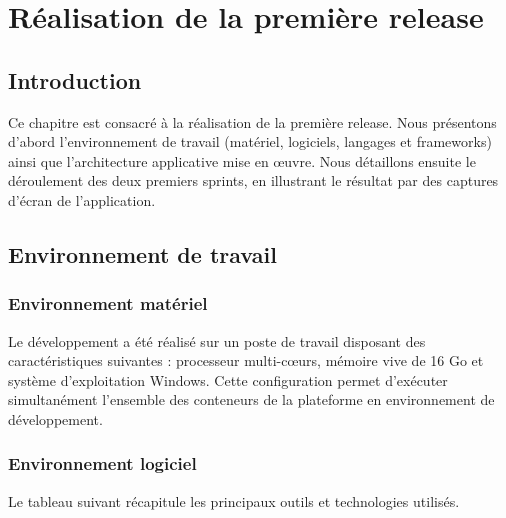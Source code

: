 \chapter{Réalisation de la première release}
\minitoc
\vspace{0.6cm}

\section*{Introduction}
Ce chapitre est consacré à la réalisation de la première release. Nous présentons d'abord
l'environnement de travail (matériel, logiciels, langages et frameworks) ainsi que
l'architecture applicative mise en œuvre. Nous détaillons ensuite le déroulement des deux
premiers sprints, en illustrant le résultat par des captures d'écran de l'application.

\section{Environnement de travail}

\subsection{Environnement matériel}
Le développement a été réalisé sur un poste de travail disposant des caractéristiques
suivantes : processeur multi-cœurs, mémoire vive de 16 Go et système d'exploitation Windows.
Cette configuration permet d'exécuter simultanément l'ensemble des conteneurs de la plateforme
en environnement de développement.

\subsection{Environnement logiciel}
Le tableau suivant récapitule les principaux outils et technologies utilisés.

